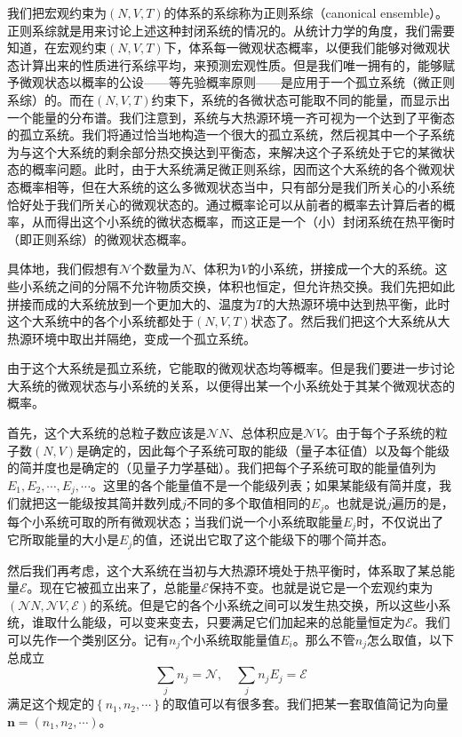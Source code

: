 \documentclass[main.tex]{subfiles}
\begin{document}
我们把宏观约束为$\left(N,V,T\right)$的体系的系综称为正则系综（canonical ensemble）。正则系综就是用来讨论上述这种封闭系统的情况的。从统计力学的角度，我们需要知道，在宏观约束$\left(N,V,T\right)$下，体系每一微观状态概率，以便我们能够对微观状态计算出来的性质进行系综平均，来预测宏观性质。但是我们唯一拥有的，能够赋予微观状态以概率的公设——等先验概率原则——是应用于一个孤立系统（微正则系综）的。而在$\left(N,V,T\right)$约束下，系统的各微状态可能取不同的能量，而显示出一个能量的分布谱。我们注意到，系统与大热源环境一齐可视为一个达到了平衡态的孤立系统。我们将通过恰当地构造一个很大的孤立系统，然后视其中一个子系统为与这个大系统的剩余部分热交换达到平衡态，来解决这个子系统处于它的某微状态的概率问题。此时，由于大系统满足微正则系综，因而这个大系统的各个微观状态概率相等，但在大系统的这么多微观状态当中，只有部分是我们所关心的小系统恰好处于我们所关心的微观状态的。通过概率论可以从前者的概率去计算后者的概率，从而得出这个小系统的微状态概率，而这正是一个（小）封闭系统在热平衡时（即正则系综）的微观状态概率。

具体地，我们假想有$\mathcal{N}$个数量为$N$、体积为$V$的小系统，拼接成一个大的系统。这些小系统之间的分隔不允许物质交换，体积也恒定，但允许热交换。我们先把如此拼接而成的大系统放到一个更加大的、温度为$T$的大热源环境中达到热平衡，此时这个大系统中的各个小系统都处于$\left(N,V,T\right)$状态了。然后我们把这个大系统从大热源环境中取出并隔绝，变成一个孤立系统。

由于这个大系统是孤立系统，它能取的微观状态均等概率。但是我们要进一步讨论大系统的微观状态与小系统的关系，以便得出某一个小系统处于其某个微观状态的概率。

首先，这个大系统的总粒子数应该是$\mathcal{N}N$、总体积应是$\mathcal{N}V$。由于每个子系统的粒子数$\left(N,V\right)$是确定的，因此每个子系统可取的能级（量子本征值）以及每个能级的简并度也是确定的（见量子力学基础）。我们把每个子系统可取的能量值列为$E_1,E_2,\cdots,E_j,\cdots$。这里的各个能量值不是一个能级列表；如果某能级有简并度，我们就把这一能级按其简并数列成$j$不同的多个取值相同的$E_j$。也就是说$j$遍历的是，每个小系统可取的所有微观状态；当我们说一个小系统取能量$E_j$时，不仅说出了它所取能量的大小是$E_j$的值，还说出它取了这个能级下的哪个简并态。

然后我们再考虑，这个大系统在当初与大热源环境处于热平衡时，体系取了某总能量$\mathcal{E}$。现在它被孤立出来了，总能量$\mathcal{E}$保持不变。也就是说它是一个宏观约束为$\left(\mathcal{N}N,\mathcal{N}V,\mathcal{E}\right)$的系统。但是它的各个小系统之间可以发生热交换，所以这些小系统，谁取什么能级，可以变来变去，只要满足它们加起来的总能量恒定为$\mathcal{E}$。我们可以先作一个类别区分。记有$n_j$个小系统取能量值$E_i$。那么不管$n_j$怎么取值，以下总成立
\begin{equation}\label{eq:V.2_canonical_ensemble_constraints}
    \sum_jn_j=\mathcal{N},\quad\sum_jn_jE_j=\mathcal{E}
\end{equation}
满足这个规定的$\left\{n_1,n_2,\cdots\right\}$的取值可以有很多套。我们把某一套取值简记为向量$\mathbf{n}=\left(n_1,n_2,\cdots\right)$。
\end{document}
